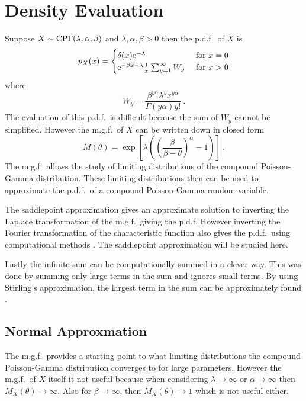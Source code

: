 \section{Density Evaluation}
Suppose $X\sim\operatorname{CP\Gamma}(\lambda,\alpha,\beta)$ and $\lambda,\alpha,\beta>0$ then the p.d.f.~of $X$ is
\begin{equation}
	p_X(x) = 
	\begin{cases}
		\delta(x) \mathrm{e}^{-\lambda} & \text{ for } x=0 \\ 
		\mathrm{e}^{-\beta x-\lambda}\frac{1}{x}\sum_{y=1}^{\infty}W_y & \text{ for } x>0 
	\end{cases}
\end{equation}
where
\begin{equation}
	W_y = \frac{\beta^{y\alpha}\lambda^yx^{y\alpha}}{\Gamma(y\alpha)y!}
	\ .
	\label{eq:compoundPoisson_w}
\end{equation}
The evaluation of this p.d.f.~is difficult because the sum of $W_y$ cannot be simplified. However the m.g.f.~of $X$ can be written down in closed form
\begin{equation}
	M(\theta)=\exp\left[\lambda\left(\left(\frac{\beta}{\beta-\theta}\right)^{\alpha}-1\right)\right]
	\ .
\end{equation}
The m.g.f.~allows the study of limiting distributions of the compound Poisson-Gamma distribution. These limiting distributions then can be used to approximate the p.d.f.~of a compound Poisson-Gamma random variable.

The saddlepoint approximation \citep{daniels1954saddlepoint} gives an approximate solution to inverting the Laplace transformation  of the m.g.f.~giving the p.d.f. However inverting the Fourier transformation of the characteristic function also gives the p.d.f.~using computational methods \citep{dunn2008evaluation}. The saddlepoint approximation will be studied here.

Lastly the infinite sum can be computationally summed in a clever way. This was done by summing only large terms in the sum and ignores small terms. By using Stirling's approximation, the largest term in the sum can be approximately found \citep{dunn2005series}.

\subsection{Normal Approxmation}
The m.g.f.~provides a starting point to what limiting distributions the compound Poisson-Gamma distribution converges to for large parameters. However the m.g.f.~of $X$ itself it not useful because when considering $\lambda\rightarrow\infty$ or $\alpha\rightarrow\infty$ then $M_X(\theta)\rightarrow\infty$. Also for $\beta\rightarrow\infty$, then $M_X(\theta)\rightarrow 1$ which is not useful either.

